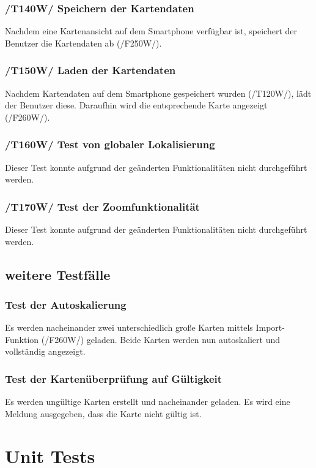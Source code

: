 \documentclass[10pt,a4paper]{article}
\begin{document}
			\subsubsection{/T140W/ Speichern der Kartendaten}
			Nachdem eine Kartenansicht auf dem Smartphone verfügbar ist, speichert der Benutzer die Kartendaten ab (/F250W/).
			
			\subsubsection{/T150W/ Laden der Kartendaten}
			Nachdem Kartendaten auf dem Smartphone gespeichert wurden (/T120W/), lädt der Benutzer diese.
			Daraufhin wird die entsprechende Karte angezeigt (/F260W/).
			
			\subsubsection{/T160W/ Test von globaler Lokalisierung}
			Dieser Test konnte aufgrund der ge\"anderten Funktionalit\"aten nicht durchgef\"uhrt werden.
			
			\subsubsection{/T170W/ Test der Zoomfunktionalit\"at}
			Dieser Test konnte aufgrund der ge\"anderten Funktionalit\"aten nicht durchgef\"uhrt werden.
		
		\subsection{weitere Testfälle}
					\subsubsection{Test der Autoskalierung}
					Es werden nacheinander zwei unterschiedlich gro\ss e Karten mittels Import-Funktion (/F260W/) geladen. Beide Karten
					werden nun autoskaliert und vollst\"andig angezeigt.
					\subsubsection{Test der Karten\"uberpr\"ufung auf G\"ultigkeit}
					Es werden ung\"ultige Karten erstellt und nacheinander geladen. Es wird eine Meldung ausgegeben, dass die Karte nicht g\"ultig ist.
	
	\section{Unit Tests}
\end{document}
